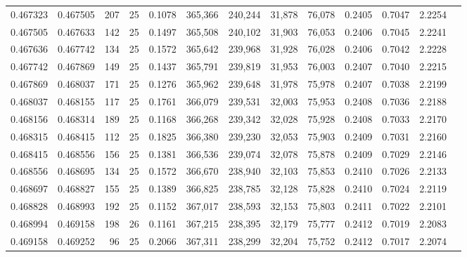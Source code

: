 \begin{tabular}{rrrrrrrrrrrrr}
0.467323 & 0.467505 &   207 &  25 &                                     0.1078 & 365,366 & 240,244 &  31,878 &  76,078 & 0.2405 & 0.7047 & 2.2254 \\
0.467505 & 0.467633 &   142 &  25 &                                     0.1497 & 365,508 & 240,102 &  31,903 &  76,053 & 0.2406 & 0.7045 & 2.2241 \\
0.467636 & 0.467742 &   134 &  25 &                                     0.1572 & 365,642 & 239,968 &  31,928 &  76,028 & 0.2406 & 0.7042 & 2.2228 \\
0.467742 & 0.467869 &   149 &  25 &                                     0.1437 & 365,791 & 239,819 &  31,953 &  76,003 & 0.2407 & 0.7040 & 2.2215 \\
0.467869 & 0.468037 &   171 &  25 &                                     0.1276 & 365,962 & 239,648 &  31,978 &  75,978 & 0.2407 & 0.7038 & 2.2199 \\
0.468037 & 0.468155 &   117 &  25 &                                     0.1761 & 366,079 & 239,531 &  32,003 &  75,953 & 0.2408 & 0.7036 & 2.2188 \\
0.468156 & 0.468314 &   189 &  25 &                                     0.1168 & 366,268 & 239,342 &  32,028 &  75,928 & 0.2408 & 0.7033 & 2.2170 \\
0.468315 & 0.468415 &   112 &  25 &                                     0.1825 & 366,380 & 239,230 &  32,053 &  75,903 & 0.2409 & 0.7031 & 2.2160 \\
0.468415 & 0.468556 &   156 &  25 &                                     0.1381 & 366,536 & 239,074 &  32,078 &  75,878 & 0.2409 & 0.7029 & 2.2146 \\
0.468556 & 0.468695 &   134 &  25 &                                     0.1572 & 366,670 & 238,940 &  32,103 &  75,853 & 0.2410 & 0.7026 & 2.2133 \\
0.468697 & 0.468827 &   155 &  25 &                                     0.1389 & 366,825 & 238,785 &  32,128 &  75,828 & 0.2410 & 0.7024 & 2.2119 \\
0.468828 & 0.468993 &   192 &  25 &                                     0.1152 & 367,017 & 238,593 &  32,153 &  75,803 & 0.2411 & 0.7022 & 2.2101 \\
0.468994 & 0.469158 &   198 &  26 &                                     0.1161 & 367,215 & 238,395 &  32,179 &  75,777 & 0.2412 & 0.7019 & 2.2083 \\
0.469158 & 0.469252 &    96 &  25 &                                     0.2066 & 367,311 & 238,299 &  32,204 &  75,752 & 0.2412 & 0.7017 & 2.2074 \\

\end{tabular}
